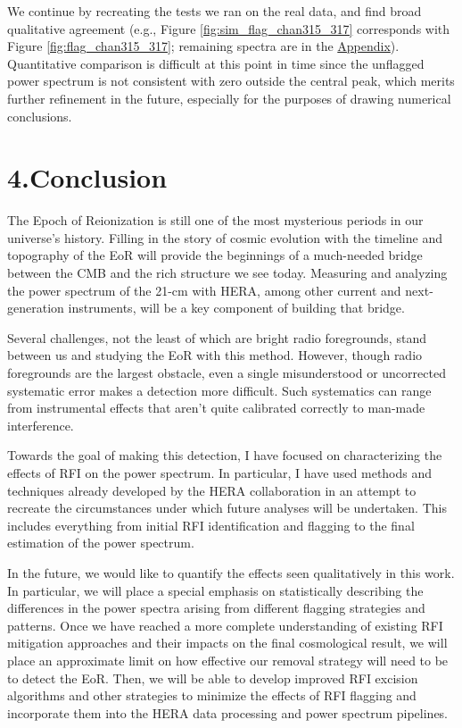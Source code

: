 \documentclass[12pt]{article}
\begin{document}
We continue by recreating the tests we ran on the real data, and find broad qualitative agreement (e.g., Figure \ref{fig:sim_flag_chan315_317} corresponds with Figure \ref{fig:flag_chan315_317}; remaining spectra are in the \hyperlink{appendix}{Appendix}). Quantitative comparison is difficult at this point in time since the unflagged power spectrum is not consistent with zero outside the central peak, which merits further refinement in the future, especially for the purposes of drawing numerical conclusions. \vspace{3mm}

\tocless\section{\hypertarget{sec:conclusion}{4.\hspace{0.75em}Conclusion}}

The Epoch of Reionization is still one of the most mysterious periods in our universe's history. Filling in the story of cosmic evolution with the timeline and topography of the EoR will provide the beginnings of a much-needed bridge between the CMB and the rich structure we see today. Measuring and analyzing the power spectrum of the 21-cm with HERA, among other current and next-generation instruments, will be a key component of building that bridge.

Several challenges, not the least of which are bright radio foregrounds, stand between us and studying the EoR with this method. However, though radio foregrounds are the largest obstacle, even a single misunderstood or uncorrected systematic error makes a detection more difficult. Such systematics can range from instrumental effects that aren't quite calibrated correctly to man-made interference.

Towards the goal of making this detection, I have focused on characterizing the effects of RFI on the power spectrum. In particular, I have used methods and techniques already developed by the HERA collaboration in an attempt to recreate the circumstances under which future analyses will be undertaken. This includes everything from initial RFI identification and flagging to the final estimation of the power spectrum.

In the future, we would like to quantify the effects seen qualitatively in this work. In particular, we will place a special emphasis on statistically describing the differences in the power spectra arising from different flagging strategies and patterns. Once we have reached a more complete understanding of existing RFI mitigation approaches and their impacts on the final cosmological result, we will place an approximate limit on how effective our removal strategy will need to be to detect the EoR. Then, we will be able to develop improved RFI excision algorithms and other strategies to minimize the effects of RFI flagging and incorporate them into the HERA data processing and power spectrum pipelines. \vspace{3mm}
\end{document}
